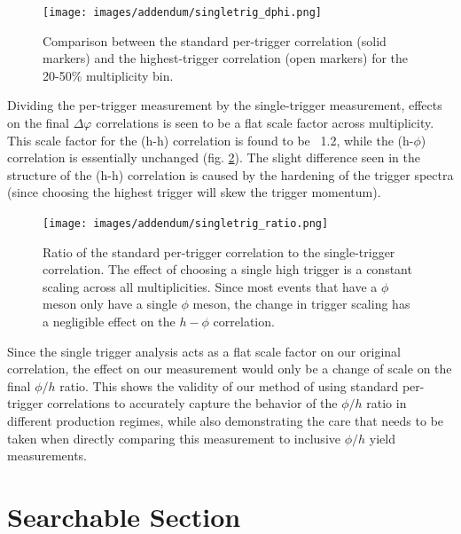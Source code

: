 \documentclass[ALICE,manyauthors]{ALICE_analysis_notes}
\begin{document}
\begin{itemize}
\begin{figure}[!htb]
\centering
\texttt{[image: images/addendum/singletrig\_dphi.png]}
\caption{Comparison between the standard per-trigger correlation (solid markers) and the highest-trigger correlation (open markers) for the 20-50\% multiplicity bin.}
\label{singletrigcorr}
\end{figure}

Dividing the per-trigger measurement by the single-trigger measurement,  effects on the final $\Delta\varphi$ correlations is seen to be a flat scale factor across multiplicity. This scale factor for the (h-h) correlation is found to be ~1.2, while the (h-$\phi$) correlation is essentially unchanged (fig. \ref{singletrigratio}).  The slight difference seen in the structure of the (h-h) correlation is caused by the hardening of the trigger spectra (since choosing the highest trigger will skew the trigger momentum).

\begin{figure}[!htb]
\centering
\texttt{[image: images/addendum/singletrig\_ratio.png]}
\caption{Ratio of the standard per-trigger correlation to the single-trigger correlation. The effect of choosing a single high trigger is a constant scaling across all multiplicities.  Since most events that have a $\phi$ meson only have a single $\phi$ meson, the change in trigger scaling has a negligible effect on the $h-\phi$ correlation.}
\label{singletrigratio}
\end{figure}

Since the single trigger analysis acts as a flat scale factor on our original correlation, the effect on our measurement would only be a change of scale on the final $\phi/h$ ratio.  This shows the validity of our method of using standard per-trigger correlations to accurately capture the behavior of the $\phi/h$ ratio in different production regimes, while also demonstrating the care that needs to be taken when directly comparing this measurement to inclusive $\phi/h$ yield measurements. 



\clearpage
\section{Searchable Section}


\end{itemize}
\end{document}
